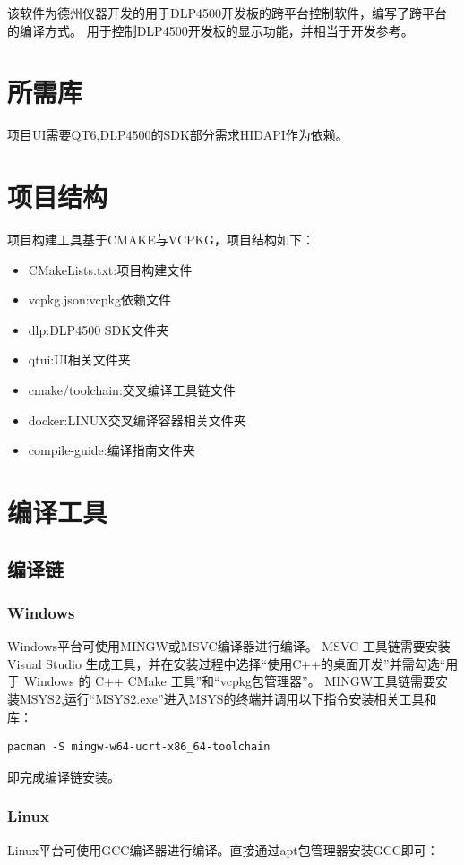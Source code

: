\documentclass{easybook}
\begin{document}
\author{XiaoTang}
\date{2026.1.30}
该软件为德州仪器开发的用于DLP4500开发板的跨平台控制软件，编写了跨平台的编译方式。
用于控制DLP4500开发板的显示功能，并相当于开发参考。
\section{所需库}
项目UI需要QT6,DLP4500的SDK部分需求HIDAPI作为依赖。
\section{项目结构}
项目构建工具基于CMAKE与VCPKG，项目结构如下：
\begin{itemize}
    \item CMakeLists.txt:项目构建文件
    \item vcpkg.json:vcpkg依赖文件
    \item dlp:DLP4500 SDK文件夹
    \item qtui:UI相关文件夹
    \item cmake/toolchain:交叉编译工具链文件
    \item docker:LINUX交叉编译容器相关文件夹
    \item compile-guide:编译指南文件夹
\end{itemize}
\section{编译工具}
\subsection{编译链}
\subsubsection{Windows}
Windows平台可使用MINGW或MSVC编译器进行编译。
MSVC 工具链需要安装Visual Studio 生成工具，并在安装过程中选择“使用C++的桌面开发”并需勾选“用于 Windows 的 C++ CMake 工具”和“vcpkg包管理器”。
MINGW工具链需要安装MSYS2,运行“MSYS2.exe”进入MSYS的终端并调用以下指令安装相关工具和库：

\begin{lstlisting}
pacman -S mingw-w64-ucrt-x86_64-toolchain
\end{lstlisting}
即完成编译链安装。

\subsubsection{Linux}
Linux平台可使用GCC编译器进行编译。直接通过apt包管理器安装GCC即可：
\end{document}
